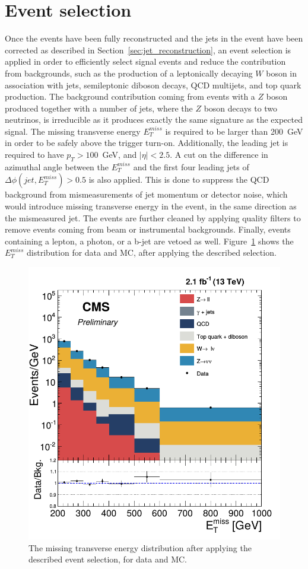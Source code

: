 \section{Event selection}
\label{sec:selection}

Once the events have been fully reconstructed and the jets in the event have been corrected as described in Section~\ref{sec:jet_reconstruction}, an event selection is applied in order to efficiently select signal events and reduce the contribution from backgrounds, such as the production of a leptonically decaying $W$ boson in association with jets, semileptonic diboson decays, QCD multijets, and top quark production. The background contribution coming from events with a $Z$ boson produced together with a number of jets, where the $Z$ boson decays to two neutrinos, is irreducible as it produces exactly the same signature as the expected signal. The missing transverse energy $E_T^{miss}$ is required to be larger than 200~GeV in order to be safely above the trigger turn-on. Additionally, the leading jet is required to have $p_T > 100$~GeV, and $|\eta| < 2.5$. A cut on the difference in azimuthal angle between the $E_T^{miss}$ and the first four leading jets of $\Delta\phi(jet, E_T^{miss}) > 0.5$ is also applied. This is done to suppress the QCD background from mismeasurements of jet momentum or detector noise, which would introduce missing transverse energy in the event, in the same direction as the mismeasured jet. The events are further cleaned by applying quality filters to remove events coming from beam or instrumental backgrounds. Finally, events containing a lepton, a photon, or a b-jet are vetoed as well. Figure~\ref{fig:MET} shows the $E_T^{miss}$ distribution for data and MC, after applying the described selection.

\begin{figure}[ht]
  \centering
 \includegraphics[width=.6\textwidth]{MET.png} 
 \caption{The missing transverse energy distribution after applying the described event selection, for data and MC.}
 \label{fig:MET}
\end{figure}

